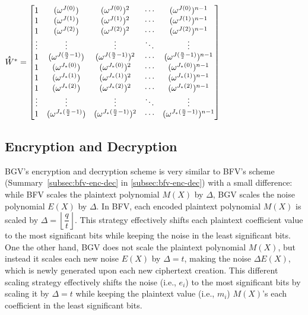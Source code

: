 \begin{tcolorbox}[title={\textbf{\tboxlabel{\ref*{subsec:bgv-encoding-decoding}} BGV's Encoding and Decoding}}]
$\hathat{W}^* = \begin{bmatrix}
1 & (\omega^{J(0)}) & (\omega^{J(0)})^2 & \cdots & (\omega^{J(0)})^{n-1}\\
1 & (\omega^{J(1)}) & (\omega^{J(1)})^2 & \cdots & (\omega^{J(1)})^{n-1}\\
1 & (\omega^{J(2)}) & (\omega^{J(2)})^2 & \cdots & (\omega^{J(2)})^{n-1}\\
\vdots & \vdots & \vdots & \ddots & \vdots \\
1 & (\omega^{J(\frac{n}{2}-1)}) & (\omega^{J(\frac{n}{2}-1)})^2 & \cdots & (\omega^{J(\frac{n}{2}-1)})^{n-1}\\
1 & (\omega^{J_*(0)}) & (\omega^{J_*(0)})^2 & \cdots & (\omega^{J_*(0)})^{n-1}\\
1 & (\omega^{J_*(1)}) & (\omega^{J_*(1)})^2 & \cdots & (\omega^{J_*(1)})^{n-1}\\
1 & (\omega^{J_*(2)}) & (\omega^{J_*(2)})^2 & \cdots & (\omega^{J_*(2)})^{n-1}\\
\vdots & \vdots & \vdots & \ddots & \vdots \\
1 & (\omega^{J_*(\frac{n}{2}-1)}) & (\omega^{J_*(\frac{n}{2}-1)})^2 & \cdots & (\omega^{J_*(\frac{n}{2}-1)})^{n-1}\\
\end{bmatrix}$

\end{tcolorbox}


\subsection{Encryption and Decryption}
\label{subsec:bgv-enc-dec}

BGV's encryption and decryption scheme is very similar to BFV's scheme (Summary~\ref*{subsec:bfv-enc-dec} in \autoref{subsec:bfv-enc-dec}) with a small difference: while BFV scales the plaintext polynomial $M(X)$ by $\Delta$, BGV scales the noise polynomial $E(X)$ by $\Delta$. In BFV, each encoded plaintext polynomial $M(X)$ is scaled by $ \Delta = \left\lfloor \dfrac{q}{t} \right\rfloor$. This strategy effectively shifts each plaintext coefficient value to the most significant bits while keeping the noise in the least significant bits. One the other hand, BGV does not scale the plaintext polynomial $M(X)$, but instead it scales each new noise $E(X)$ by $\Delta = t$, making the noise $\Delta E(X)$, which is newly generated upon each new ciphertext creation. This different scaling strategy effectively shifts the noise (i.e., $e_i$) to the most significant bits by scaling it by $\Delta = t$ while keeping the plaintext value (i.e., $m_i$) $M(X)$'s each coefficient in the least significant bits. 

